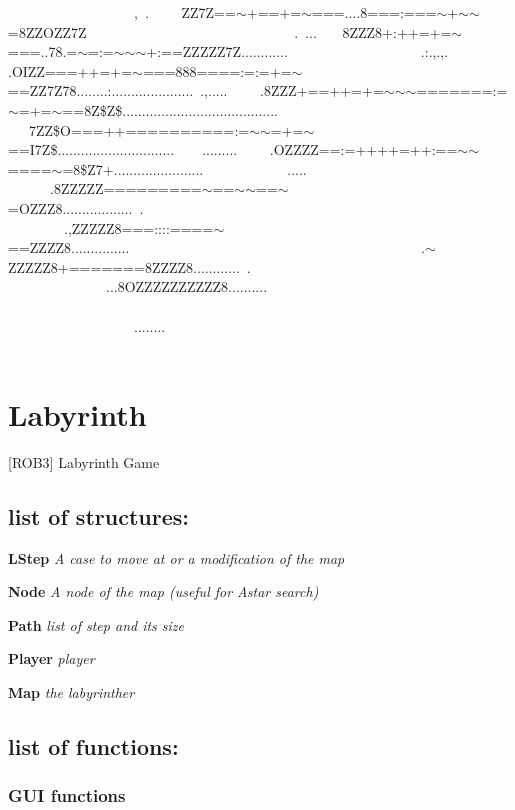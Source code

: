                   , .\+     Z\+Z7Z==$\sim$+==+=$\sim$===....8===\+:===$\sim$+$\sim$$\sim$=8\+Z\+Z\+O\+Z\+Z7\+Z                              .\+ ...    8\+Z\+Z\+Z8+\+:++=+=$\sim$===..78.=$\sim$=\+:=$\sim$$\sim$$\sim$+\+:==Z\+Z\+Z\+Z\+Z7Z............                   .\+:.,.,.   .O\+I\+ZZ===++=+=$\sim$===888====\+:=\+:=+=$\sim$==Z\+Z7\+Z78........\+:..................... .,.....     .8\+Z\+Z\+Z+==++=+=$\sim$$\sim$$\sim$=======\+:=$\sim$=+=$\sim$==8Z\$Z\$........................................      7\+ZZ\$O===++==========\+:=$\sim$$\sim$=+=$\sim$==I7Z\$..............................    .........     .\+O\+Z\+Z\+ZZ==\+:=++++=++\+:==$\sim$$\sim$====$\sim$=8\$\+Z7+.......................            .....          .8\+Z\+Z\+Z\+ZZ=========$\sim$==$\sim$$\sim$==$\sim$=O\+Z\+Z\+Z8.................. .\+                                 .,Z\+Z\+Z\+Z\+Z8===\+:\+:\+:\+:====$\sim$==Z\+Z\+Z\+Z8...............                                          .$\sim$\+Z\+Z\+Z\+Z\+Z8+=======8\+Z\+Z\+Z\+Z8............ .\+                                                ...8\+O\+Z\+Z\+Z\+Z\+Z\+Z\+Z\+Z\+Z\+Z8..........                                                           ........                                                      

\section*{Labyrinth}

\mbox{[}R\+O\+B3\mbox{]} Labyrinth Game

\subsection*{list of structures\+:}

{\bfseries L\+Step} {\itshape A case to move at or a modification of the map}

{\bfseries Node} {\itshape A node of the map (useful for Astar search)}

{\bfseries Path} {\itshape list of step and its size}

{\bfseries Player} {\itshape player}

{\bfseries Map} {\itshape the labyrinther}

\subsection*{list of functions\+:}

\subsubsection*{G\+UI functions}

